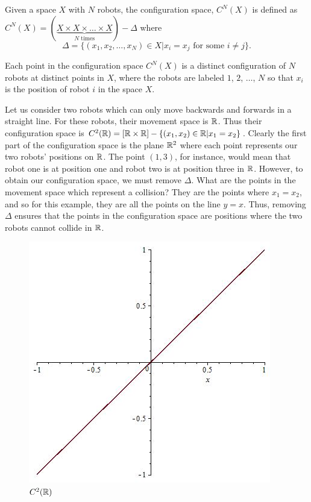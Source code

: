 \begin{defn}
Given a space $X$ with $N$ robots, the configuration space, $C^N(X)$ is defined as $C^N(X)= (\underbrace{X \times X\times \dots \times X}_{N \text{ times} }) - \Delta$ where $$\Delta = \{(x_1, x_2, \dots, x_N) \in X | x_i =x_j \text{ for some } i \neq j\}.$$ 
\end{defn}

Each point in the configuration space $C^N(X)$ is a distinct configuration of $N$ robots at distinct points in $X$, where the robots are labeled $1$, $2$, $\ldots$, $N$ so that $x_i$ is the position of robot $i$ in the space $X$. 

Let us consider two robots which can only move backwards and forwards in a straight line. For these robots, their movement space is $\mathbb{R}$. Thus their configuration space is $C^2(\mathbb{R}) = [\mathbb{R}\times \mathbb{R}]- \{(x_1,x_2)\in \mathbb{R} | x_1 = x_2\}$. Clearly the first part of the configuration space is the plane $\mathbb{R}^2$ where each point represents our two robots' positions on $\mathbb{R}$. The point $(1,3)$, for instance, would mean that robot one is at position one and robot two is at position three in $\mathbb{R}$. However, to obtain our configuration space, we must remove $\Delta$. What are the points in the movement space which represent a collision? They are the points where $x_1=x_2$, and so for this example, they are all the points on the line $y=x$. Thus, removing $\Delta$ ensures that the points in the configuration space are positions where the two robots cannot collide in $\mathbb{R}$.

\begin{figure}[h]\label{fig:xygraph}
\centering
\caption{$C^2(\mathbb{R})$}
\includegraphics[scale=.25]{Presentation/xygraph.jpg}
\end{figure}



